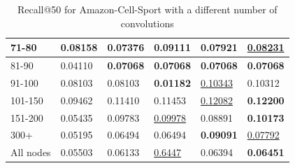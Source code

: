 \begin{table}[]
\begin{tabular}{|l|l|l|l|l|l|}
        71-80     & 0.08158                    & 0.07376                    & \textbf{0.09111}           & 0.07921                    & \underline{0.08231}        \\ \hline
        81-90     & 0.04110                    & \textbf{0.07068}           & \textbf{0.07068}           & \textbf{0.07068}           & \textbf{0.07068}           \\ \hline
        91-100    & 0.08103                    & 0.08103                    & \textbf{0.01182}           & \underline{0.10343}        & 0.10312                    \\ \hline
        101-150   & 0.09462                    & 0.11410                    & 0.11453                    & \underline{0.12082}        & \textbf{0.12200}           \\ \hline
        151-200   & 0.05435                    & 0.09783                    & \underline{0.09978}        & 0.08891                    & \textbf{0.10173}           \\ \hline
        300+      & 0.05195                    & 0.06494                    & 0.06494                    & \textbf{0.09091}           & \underline{0.07792}        \\ \hline
        All nodes   & 0.05503                    & 0.06133                    & \underline{0.6447}         & 0.06394                    & \textbf{0.06451}           \\ \hline
    \end{tabular}
    \caption{Recall@50 for Amazon-Cell-Sport with a different number of convolutions}
    \label{tab:Amazon-Cell-Sport-recall-evaluation-mean}
\end{table}

